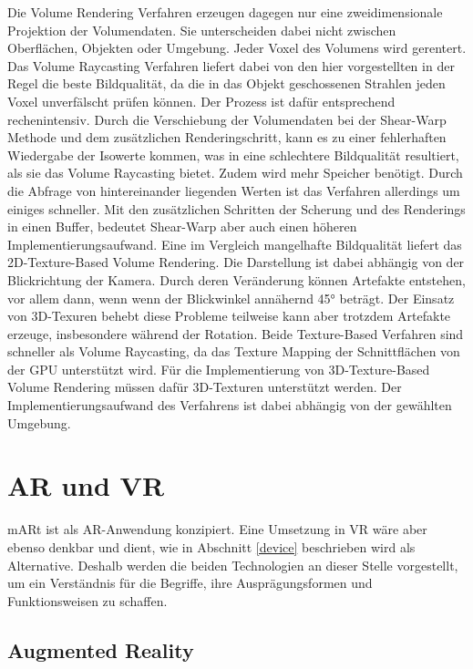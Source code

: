 Die Volume Rendering Verfahren erzeugen dagegen nur eine zweidimensionale Projektion der Volumendaten. Sie unterscheiden dabei nicht zwischen Oberflächen, Objekten oder Umgebung. Jeder Voxel des Volumens wird gerentert. 
Das Volume Raycasting Verfahren liefert dabei von den hier vorgestellten in der Regel die beste Bildqualität, da die in das Objekt geschossenen Strahlen jeden Voxel unverfälscht prüfen können. Der Prozess ist dafür entsprechend rechenintensiv.
Durch die Verschiebung der Volumendaten bei der Shear-Warp Methode und dem zusätzlichen Renderingschritt, kann es zu einer fehlerhaften Wiedergabe der Isowerte kommen, was in eine schlechtere Bildqualität resultiert, als sie das Volume Raycasting bietet. Zudem wird mehr Speicher benötigt. Durch die Abfrage von hintereinander liegenden Werten ist das Verfahren allerdings um einiges schneller. Mit den zusätzlichen Schritten der Scherung und des Renderings in einen Buffer, bedeutet Shear-Warp aber auch einen höheren Implementierungsaufwand.
Eine im Vergleich mangelhafte Bildqualität liefert das 2D-Texture-Based Volume Rendering. Die Darstellung ist dabei abhängig von der Blickrichtung der Kamera. Durch deren Veränderung können Artefakte entstehen, vor allem dann, wenn wenn der Blickwinkel annähernd 45° beträgt.
Der Einsatz von 3D-Texuren behebt diese Probleme teilweise kann aber trotzdem Artefakte erzeuge, insbesondere während der Rotation.
Beide Texture-Based Verfahren sind schneller als Volume Raycasting, da das Texture Mapping der Schnittflächen von der GPU unterstützt wird. Für die Implementierung von 3D-Texture-Based Volume Rendering  müssen dafür 3D-Texturen unterstützt werden. 
Der Implementierungsaufwand des Verfahrens ist dabei abhängig von der gewählten Umgebung.



\section{AR und VR}		
\label{arVr}							 %

mARt ist als AR-Anwendung konzipiert. Eine Umsetzung in VR wäre aber ebenso denkbar und dient, wie in Abschnitt \ref{device} beschrieben wird als Alternative.
Deshalb werden die beiden Technologien an dieser Stelle vorgestellt, um ein Verständnis für die Begriffe, ihre Ausprägungsformen und Funktionsweisen zu schaffen.

\subsection{Augmented Reality}

